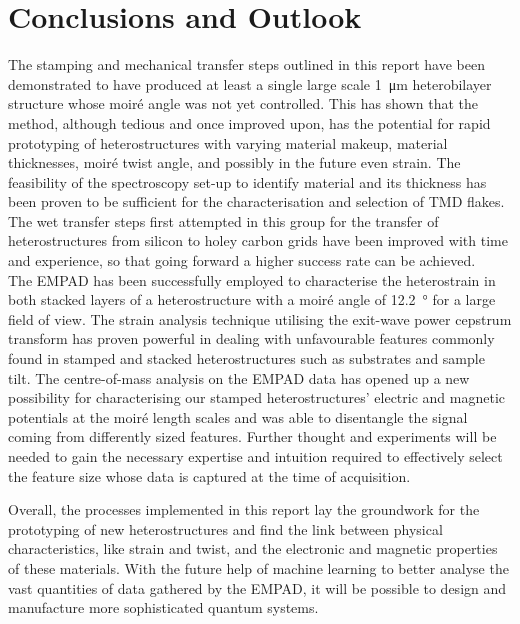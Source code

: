 \section{Conclusions and Outlook}
\label{sec:outlook}
The stamping and mechanical transfer steps outlined in this report have been demonstrated to have produced at least a single large scale \SI{1}{\micro\meter} heterobilayer structure whose moiré angle was not yet controlled. This has shown that the method, although tedious and once improved upon, has the potential for rapid prototyping of heterostructures with varying material makeup, material thicknesses, moiré twist angle, and possibly in the future even strain. The feasibility of the spectroscopy set-up to identify material and its thickness has been proven to be sufficient for the characterisation and selection of TMD flakes. The wet transfer steps first attempted in this group for the transfer of heterostructures from silicon to holey carbon grids have been improved with time and experience, so that going forward a higher success rate can be achieved.\\
The EMPAD has been successfully employed to characterise the heterostrain in both stacked layers of a heterostructure with a moiré angle of \SI{12.2}{\degree} for a large field of view. The strain analysis technique utilising the exit-wave power cepstrum transform has proven powerful in dealing with unfavourable features commonly found in stamped and stacked heterostructures such as substrates and sample tilt. The centre-of-mass analysis on the EMPAD data has opened up a new possibility for characterising our stamped heterostructures' electric and magnetic potentials at the moiré length scales and was able to disentangle the signal coming from differently sized features. Further thought and experiments will be needed to gain the necessary expertise and intuition required to effectively select the feature size whose data is captured at the time of acquisition.

Overall, the processes implemented in this report lay the groundwork for the prototyping of new heterostructures and find the link between physical characteristics, like strain and twist, and the electronic and magnetic properties of these materials. With the future help of machine learning to better analyse the vast quantities of data gathered by the EMPAD, it will be possible to design and manufacture more sophisticated quantum systems.
